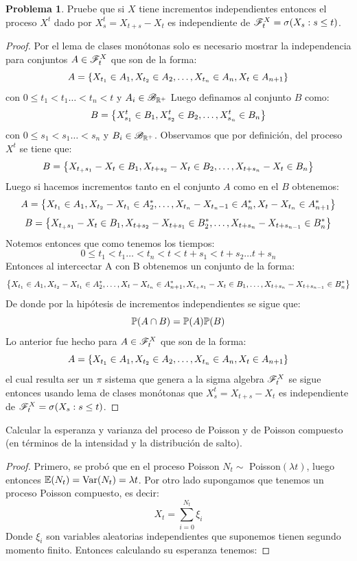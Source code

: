 \documentclass[a5paper,oneside]{amsart}
\theoremstyle{plain}
\theoremstyle{definition}
\newtheorem{problema}{Problema}
\begin{document}
\begin{problema}
Pruebe que si $X$ tiene incrementos independientes entonces el proceso $X^t$ dado por $X^t_s=X_{t+s}-X_t$ es independiente de $\mathscr{F}^X_t=\sigma\!\left( X_s:s \leq t\right) $.
\begin{proof}
Por el lema de clases mon\'otonas solo es necesario mostrar la independencia para conjuntos $A \in \mathscr{F}^X_t$ que son de la forma:
$$
A=\left\{ X_{t_1}\in A_1, X_{t_2}\in A_2,\ldots, X_{t_n} \in A_n, X_t \in A_{n+1}\right\} 
$$
con  $0 \leq t_1 < t_1 \ldots < t_n < t$ y $A_i \in \mathscr{B}_{\mathbb{R}^+}$
Luego definamos al conjunto $B$ como:
$$
B=\left\{ X^t_{s_1} \in B_1,X^t_{s_2} \in B_2,\ldots, X^t_{s_n} \in B_n\right\} 
$$
con  $0 \leq s_1 < s_1 \ldots < s_n $ y $B_i \in \mathscr{B}_{\mathbb{R}^+}$.
Observamos que por definici\'on, del proceso $X^t$ se tiene que:
$$
B=\left\{ X_{t_+{s_1}}-X_t \in B_1,X_{t+{s_2}}-X_t \in B_2,\ldots, X_{t+{s_n}}-X_t \in B_n\right\} 
$$
Luego si hacemos incrementos  tanto en el conjunto $A$ como en el $B$ obtenemos:
$$
A=\left\{ X_{t_1}\in A_1, X_{t_2}-X_{t_1} \in A^*_2,\ldots, X_{t_n}-X_{t_n-1} \in A^*_n, X_t-X_{t_n} \in A^*_{n+1}\right\} 
$$
$$
B=\left\{ X_{t_+{s_1}}-X_t \in B_1,X_{t+{s_2}}-X_{t+{s_1}} \in B^*_2,\ldots, X_{t+{s_n}}-X_{t+{s_{n-1}}} \in B^*_n\right\} 
$$
Notemos entonces que como tenemos los tiempos:
$$
0 \leq t_1 < t_1 \ldots < t_n < t<t+{s_1}<t+{s_2}\ldots t+{s_n}
$$
Entonces al intercectar A con B obtenemos un conjunto de la forma:
\fontsize{8pt}{8pt} \selectfont 
$$
\tiny\left\{ X_{t_1}\in A_1, X_{t_2}-X_{t_1} \in A^*_2,\ldots, X_t-X_{t_n} \in A^*_{n+1}, X_{t_+{s_1}}-X_t \in B_1,\ldots, X_{t+{s_n}}-X_{t+{s_{n-1}}} \in B^*_n\right\} 
$$
\fontsize{10pt}{10pt} \selectfont 
De donde por la hip\'otesis de incrementos independientes se sigue que:
$$
 \mathbb{P} (A \cap B)= \mathbb{P} (A) \mathbb{P} (B)
$$
Lo anterior fue hecho para  $A \in \mathscr{F}^X_t$ que son de la forma: $$A=\left\{ X_{t_1}\in A_1, X_{t_2}\in A_2,\ldots, X_{t_n} \in A_n, X_t \in A_{n+1}\right\} $$ el cual resulta ser un $\pi$ sistema que genera a la sigma algebra   $\mathscr{F}^X_t$ se sigue entonces usando lema de clases mon\'otonas que $X^t_s=X_{t+s}-X_t$ es independiente de $\mathscr{F}^X_t=\sigma\!\left( X_s:s \leq t\right) $.
\end{proof}
Calcular la esperanza y varianza del proceso de Poisson y de Poisson compuesto (en t\'erminos de la intensidad y la distribuci\'on de salto). 
\begin{proof}
Primero, se prob\'o que en el proceso Poisson $N_t \sim $ Poisson$(\lambda t)$, luego entonces $\mathbb{E}\! \left( N_t \right)=\text{Var}\! \left( N_t \right)=\lambda t$. Por otro lado supongamos que tenemos un proceso Poisson compuesto, es decir:
$$
X_t=\sum_{i=0}^{N_t}\xi_i
$$
Donde $\xi_i$ son variables aleatorias independientes que suponemos tienen segundo momento finito. Entonces calculando su esperanza tenemos:

\end{proof}
\end{problema}
\end{document}

